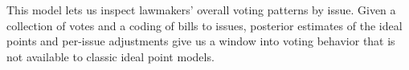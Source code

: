 




This model lets us inspect lawmakers' overall voting patterns by
issue.  Given a collection of votes and a coding of bills to issues,
posterior estimates of the ideal points and per-issue adjustments give
us a window into voting behavior that is not available to classic
ideal point models.




